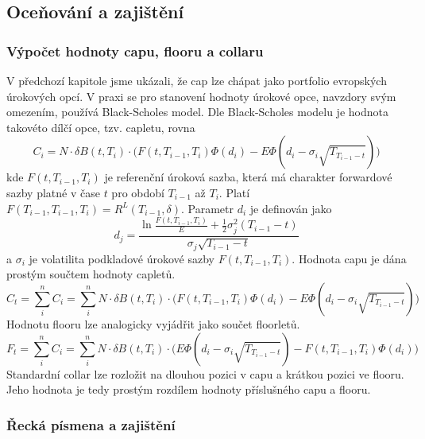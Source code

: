 \documentclass[a4paper]{book}
\begin{document}
\subsection{Oceňování a zajištění}

\subsubsection{Výpočet hodnoty capu, flooru a collaru}

V předchozí kapitole jsme ukázali, že cap lze chápat jako portfolio evropských úrokových opcí. V praxi se pro stanovení hodnoty úrokové opce, navzdory svým omezením, používá Black-Scholes model. Dle Black-Scholes modelu je hodnota takovéto dílčí opce, tzv. capletu, rovna
\begin{equation*}
C_i = N \cdot \delta B(t, T_i) \cdot \big( F(t, T_{i-1}, T_i)\Phi(d_i) - E\Phi(d_i - \sigma_i \sqrt{T_{T_{i-1}-t}})\big)
\end{equation*}
kde $F(t, T_{i-1}, T_i)$ je referenční úroková sazba, která má charakter forwardové sazby platné v čase $t$ pro období $T_{i-1}$ až $T_i$. Platí $F(T_{i-1}, T_{i-1}, T_i) = R^L(T_{i-1}, \delta)$. Parametr $d_i$ je definován jako
\begin{equation*}
d_j = \frac{\ln \frac{F(t, T_{i-1}, T_i)}{E} + \frac{1}{2}\sigma_j^2(T_{i-1} - t)}{\sigma_j \sqrt{T_{i-1}-t}}
\end{equation*}
a $\sigma_i$ je volatilita podkladové úrokové sazby $F(t, T_{i-1}, T_i)$. Hodnota capu je dána prostým součtem hodnoty capletů.
\begin{equation*}
C_t = \sum_i^n C_i = \sum_i^n N \cdot \delta B(t, T_i) \cdot \big( F(t, T_{i-1}, T_{i})\Phi(d_i) - E\Phi(d_i - \sigma_i \sqrt{T_{T_{i-1}-t}})\big)
\end{equation*}
Hodnotu flooru lze analogicky vyjádřit jako součet floorletů.
\begin{equation*}
F_t = \sum_i^n C_i = \sum_i^n N \cdot \delta B(t, T_i) \cdot \big( E\Phi(d_i - \sigma_i \sqrt{T_{T_{i-1}-t}}) - F(t, T_{i-1}, T_{i})\Phi(d_i) \big)
\end{equation*}
Standardní collar lze rozložit na dlouhou pozici v capu a krátkou pozici ve flooru. Jeho hodnota je tedy prostým rozdílem hodnoty příslušného capu a flooru.

\subsubsection{Řecká písmena a zajištění}
\end{document}
